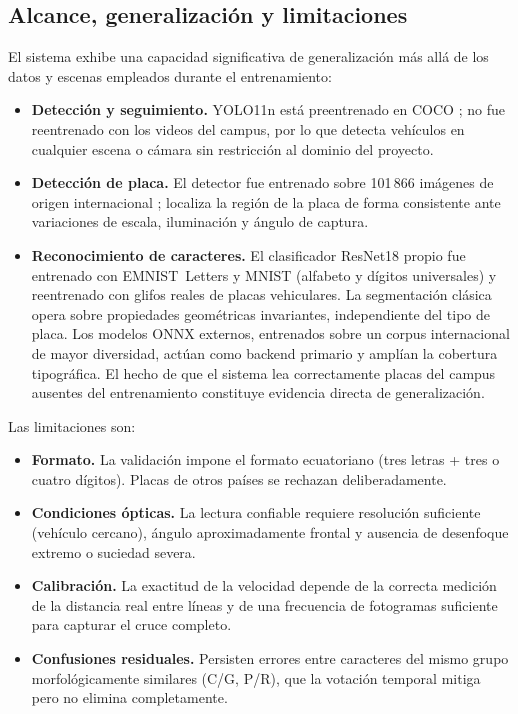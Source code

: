 \documentclass[11pt]{article}
\begin{document}
\subsection{Alcance, generalización y limitaciones}

El sistema exhibe una capacidad significativa de generalización más allá de los datos
y escenas empleados durante el entrenamiento:

\begin{itemize}
    \item \textbf{Detección y seguimiento.} YOLO11n está preentrenado en COCO
    \cite{yolo11}; no fue reentrenado con los videos del campus, por lo que detecta
    vehículos en cualquier escena o cámara sin restricción al dominio del proyecto.
    \item \textbf{Detección de placa.} El detector fue entrenado sobre 101\,866 imágenes
    de origen internacional \cite{ds_placas}; localiza la región de la placa de forma
    consistente ante variaciones de escala, iluminación y ángulo de captura.
    \item \textbf{Reconocimiento de caracteres.} El clasificador ResNet18 propio fue
    entrenado con EMNIST~Letters y MNIST (alfabeto y dígitos universales) y
    reentrenado con glifos reales de placas vehiculares. La segmentación clásica opera
    sobre propiedades geométricas invariantes, independiente del tipo de placa. Los
    modelos ONNX externos, entrenados sobre un corpus internacional de mayor diversidad,
    actúan como backend primario y amplían la cobertura tipográfica. El hecho de que el
    sistema lea correctamente placas del campus ausentes del entrenamiento constituye
    evidencia directa de generalización.
\end{itemize}

Las limitaciones son:
\begin{itemize}
    \item \textbf{Formato.} La validación impone el formato ecuatoriano (tres letras +
    tres o cuatro dígitos). Placas de otros países se rechazan deliberadamente.
    \item \textbf{Condiciones ópticas.} La lectura confiable requiere resolución
    suficiente (vehículo cercano), ángulo aproximadamente frontal y ausencia de
    desenfoque extremo o suciedad severa.
    \item \textbf{Calibración.} La exactitud de la velocidad depende de la correcta
    medición de la distancia real entre líneas y de una frecuencia de fotogramas
    suficiente para capturar el cruce completo.
    \item \textbf{Confusiones residuales.} Persisten errores entre caracteres del mismo
    grupo morfológicamente similares (C/G, P/R), que la votación temporal mitiga pero
    no elimina completamente.
\end{itemize}
\end{document}
